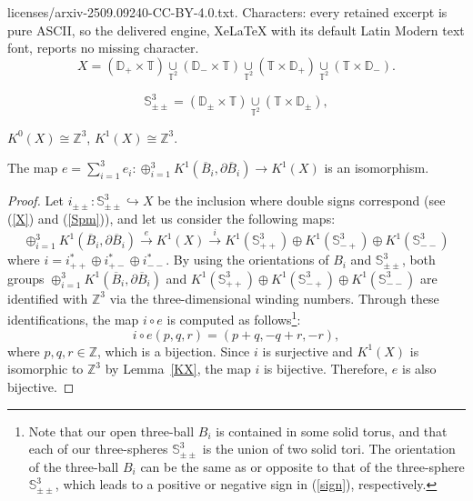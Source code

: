 \documentclass[10pt,a4paper]{amsart}
\newcommand{\D}{\mathbb{D}}
\newcommand{\SSS}{\mathbb{S}}
\newcommand{\T}{\mathbb{T}}
\newcommand{\Z}{\mathbb{Z}}
\begin{document}
licenses/arxiv-2509.09240-CC-BY-4.0.txt. Characters: every retained excerpt is pure ASCII, so the delivered engine, XeLaTeX with its default Latin Modern text font, reports no missing character.
\begin{equation}
\label{X}
	X = (\D_+ \times \T) \underset{\T^2}{\cup}
		(\D_- \times \T) \underset{\T^2}{\cup}
			(\T \times \D_+)	 \underset{\T^2}{\cup}
				(\T \times \D_-).
\end{equation}

\begin{equation}
\label{Spm}
	\SSS_{\pm\pm}^3 = (\D_{\pm} \times \T) \underset{\T^2}{\cup} (\T \times \D_{\pm}),
\end{equation}

\begin{lemma}
\label{KX}
	$K^0(X) \cong \Z^3$, $K^1(X) \cong \Z^3$.
\end{lemma}

\begin{lemma}
\label{mape}
The map $e = \sum_{i=1}^3 e_i \colon \oplus_{i=1}^3 K^1(\overline{B}_i, \partial \overline{B}_i) \to K^1(X)$ is an isomorphism.
\end{lemma}

\begin{proof}
Let $i_{\pm \pm} \colon \SSS_{\pm\pm}^3 \hookrightarrow X$ be the inclusion where double signs correspond (see (\ref{X}) and (\ref{Spm})), and
let us consider the following maps:
\begin{equation}
\oplus_{i=1}^3 K^1(\overline{B}_i, \partial \overline{B}_i) \overset{e}{\to}
	K^1(X) \overset{i}{\to}
		K^1(\SSS^3_{++}) \oplus K^1(\SSS^3_{-+}) \oplus K^1(\SSS^3_{--})
\end{equation}
where $i = i_{++}^* \oplus i_{+-}^* \oplus i_{--}^*$.
By using the orientations of $B_i$ and $\SSS^3_{\pm \pm}$, both groups $\oplus_{i=1}^3 K^1(\overline{B}_i, \partial \overline{B}_i)$ and $K^1(\SSS^3_{++}) \oplus K^1(\SSS^3_{-+}) \oplus K^1(\SSS^3_{--})$ are identified with $\Z^3$ via the three-dimensional winding numbers.
Through these identifications, the map $i \circ e$ is computed as follows\footnote{Note that our open three-ball $B_i$ is contained in some solid torus, and that each of our three-spheres $\SSS^3_{\pm\pm}$ is the union of two solid tori. The orientation of the three-ball $B_i$ can be the same as or opposite to that of the three-sphere $\SSS^3_{\pm\pm}$, which leads to a positive or negative sign in (\ref{sign}), respectively.}:
\begin{equation}
\label{sign}
	i \circ e (p,q,r) = (p+q, -q+r, -r),
\end{equation}
where $p,q,r \in \Z$, which is a bijection.
Since $i$ is surjective and $K^1(X)$ is isomorphic to $\Z^3$ by Lemma~\ref{KX}, the map $i$ is bijective.
Therefore, $e$ is also bijective.
\end{proof}
\end{document}

